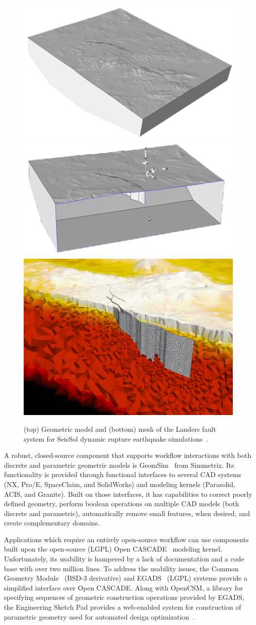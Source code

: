 \begin{figure} \centering
  \includegraphics[width=.3\textwidth]{figures/landersMdl.png}
  \includegraphics[width=.3\textwidth]{figures/landersMdl_cut.png}
  \includegraphics[width=.6\textwidth]{figures/landersMesh.pdf}
  \caption{(top) Geometric model and (bottom) mesh of the Landers
    fault system for SeisSol dynamic rupture earthquake
    simulations~\cite{seisSolGeomPoster,seisSolGordonBell2014}.}
  \label{fig:landers}
\end{figure}

A robust, closed-source component that supports workflow interactions with both
discrete and parametric geometric models is
GeomSim~\cite{simmodsuite} from Simmetrix.
Its functionality is provided through functional interfaces to several CAD
systems (NX, Pro/E, SpaceClaim, and SolidWorks) and modeling kernels (Parasolid,
ACIS, and Granite).
Built on those interfaces, it has capabilities to correct poorly defined
geometry, perform boolean operations on multiple CAD models (both discrete and
parametric), automatically remove small features, when desired, and create
complementary domains.

Applications which require an entirely open-source workflow can use components
built upon the open-source (LGPL) Open CASCADE~\cite{opencascade_web} modeling
kernel.
Unfortunately, its usability is hampered by a lack of documentation and a code
base with over two million lines.
To address the usability issues, the Common Geometry
Module~\cite{sigma_web,cgm_bitbucket,tautges2001cgm} (BSD-3 derivative) and
EGADS~\cite{haimesEgads2012} (LGPL) systems provide a simplified
interface over Open CASCADE.
Along with OpenCSM, a library for specifying sequences of geometric
construction operations provided by EGADS, the Engineering
Sketch Pad provides a web-enabled system for construction of parametric
geometry used for automated design optimization~\cite{haimesEngSketchPad2013}.

